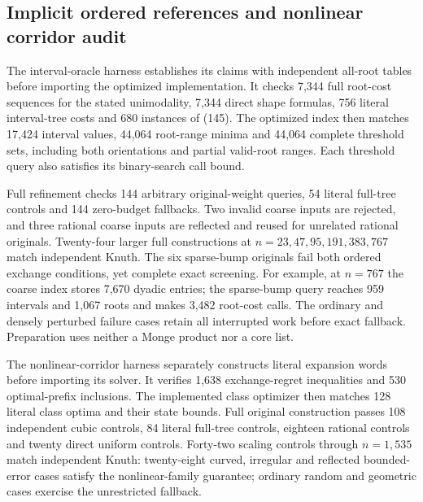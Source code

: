 \documentclass[11pt]{article}
\begin{document}
\subsection{Implicit ordered references and nonlinear corridor audit}
\label{app:ordered-reference}
The interval-oracle harness establishes its claims with independent all-root
tables before importing the optimized implementation. It checks 7,344 full
root-cost sequences for the stated unimodality, 7,344 direct shape formulas,
756 literal interval-tree costs and 680 instances of
(145). The optimized index then matches 17,424
interval values, 44,064 root-range minima and 44,064 complete threshold sets,
including both orientations and partial valid-root ranges. Each threshold
query also satisfies its binary-search call bound.

Full refinement checks 144 arbitrary original-weight queries, 54 literal
full-tree controls and 144 zero-budget fallbacks. Two invalid coarse inputs
are rejected, and three rational coarse inputs are reflected and reused for
unrelated rational originals. Twenty-four larger full constructions at
$n=23,47,95,191,383,767$ match independent Knuth. The six sparse-bump originals
fail both ordered exchange conditions, yet complete exact screening.
For example, at $n=767$ the coarse index stores 7,670 dyadic entries; the
sparse-bump query reaches 959 intervals and 1,067 roots and makes 3,482
root-cost calls. The ordinary and densely perturbed failure cases retain
all interrupted work before exact fallback. Preparation uses neither a
Monge product nor a core list.

The nonlinear-corridor harness separately constructs literal expansion
words before importing its solver. It verifies 1,638 exchange-regret
inequalities and 530 optimal-prefix inclusions. The implemented class
optimizer then matches 128 literal class optima and their state bounds.
Full original construction passes 108 independent cubic controls, 84 literal
full-tree controls, eighteen rational controls and twenty direct uniform
controls. Forty-two scaling controls through $n=1{,}535$ match independent
Knuth: twenty-eight curved, irregular and reflected bounded-error cases
satisfy the nonlinear-family guarantee; ordinary random and geometric cases
exercise the unrestricted fallback.
\end{document}
